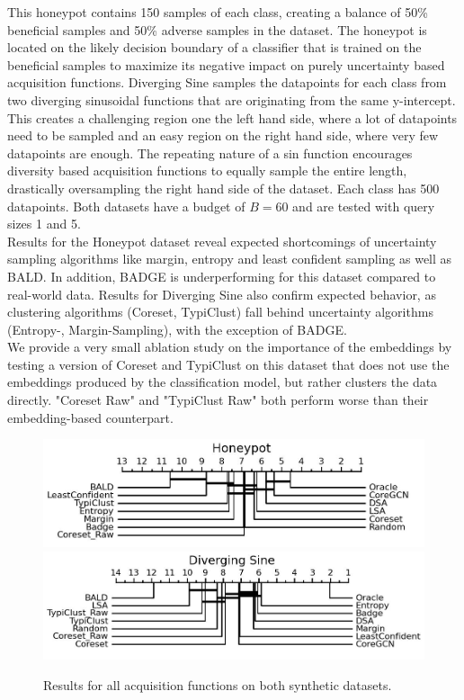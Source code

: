 \documentclass[]{article}
\begin{document}
This honeypot contains 150 samples of each class, creating a balance of 50\% beneficial samples and 50\% adverse samples in the dataset.
The honeypot is located on the likely decision boundary of a classifier that is trained on the beneficial samples to maximize its negative impact on purely uncertainty based acquisition functions.
Diverging Sine samples the datapoints for each class from two diverging sinusoidal functions that are originating from the same y-intercept.
This creates a challenging region one the left hand side, where a lot of datapoints need to be sampled and an easy region on the right hand side, where very few datapoints are enough. 
The repeating nature of a sin function encourages diversity based acquisition functions to equally sample the entire length, drastically oversampling the right hand side of the dataset.
Each class has 500 datapoints. 
Both datasets have a budget of $B=60$ and are tested with query sizes 1 and 5.\\
%
Results for the Honeypot dataset reveal expected shortcomings of uncertainty sampling algorithms like margin, entropy and least confident sampling as well as BALD.
In addition, BADGE is underperforming for this dataset compared to real-world data. 
Results for Diverging Sine also confirm expected behavior, as clustering algorithms (Coreset, TypiClust) fall behind uncertainty algorithms (Entropy-, Margin-Sampling), with the exception of BADGE. \\
We provide a very small ablation study on the importance of the embeddings by testing a version of Coreset and TypiClust on this dataset that does not use the embeddings produced by the classification model, but rather clusters the data directly.
"Coreset Raw" and "TypiClust Raw" both perform worse than their embedding-based counterpart.
\begin{figure}
	\centering
	\caption{Results for all acquisition functions on both synthetic datasets.}
	\label{fig:main_body_result}
	\includegraphics[width=0.49\linewidth]{img/micro_honeypot.jpg}
	\includegraphics[width=0.49\linewidth]{img/micro_diverging_sin.jpg}
\end{figure}
\end{document}
